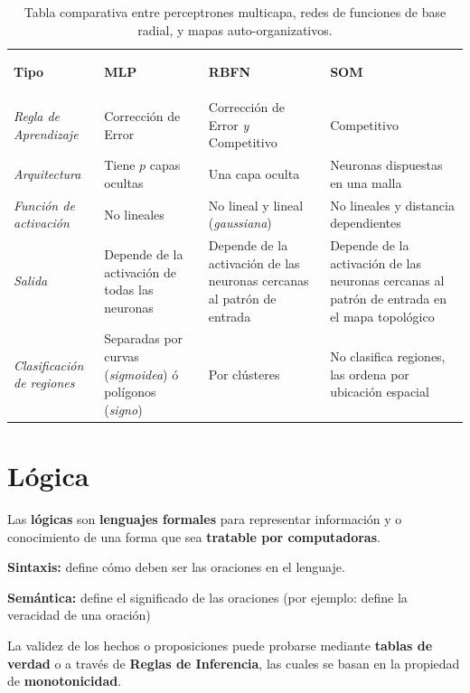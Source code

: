 \documentclass[10pt,a4paper]{article}
\begin{document}
\begin{table}[h]
\centering
\begin{tabular}{  p{2cm} | p{4cm} | p{4cm} | p{4cm}  }
\hline 
\begin{center} \textbf{Tipo} \end{center} & 
\begin{center} \textbf{MLP} \end{center} & 
\begin{center} \textbf{RBFN} \end{center}& 
\begin{center} \textbf{SOM} \end{center} \\
\rowcolor[gray]{.95} 
\textit{Regla de Aprendizaje}&
Corrección de Error &
Corrección de Error \textit{y} Competitivo &
Competitivo \\ 
\textit{Arquitectura}&
Tiene $p$ capas ocultas &
Una capa oculta &
Neuronas dispuestas en una malla \\ \rowcolor[gray]{.95} 
\textit{Función de activación} &
No lineales &
No lineal y lineal (\textit{gaussiana}) &
No lineales y distancia dependientes \\ 
\textit{Salida} &
Depende de la activación de todas las neuronas &
Depende de la activación de las neuronas cercanas al patrón de entrada &
Depende de la activación de las neuronas cercanas al patrón de entrada en el mapa topológico \\ \rowcolor[gray]{.95} 
\textit{Clasificación de regiones} &
Separadas por curvas (\textit{sigmoidea}) ó polígonos (\textit{signo}) &
Por clústeres &
No clasifica regiones, las ordena por ubicación espacial 
\\ \hline
\end{tabular}
\caption{Tabla comparativa entre perceptrones multicapa, redes de funciones de base radial, y mapas auto-organizativos.}
\label{tab:comparativo}
\end{table}

\section{Lógica}
Las \textbf{lógicas} son \textbf{lenguajes formales} para representar información y o conocimiento de una forma que sea \textbf{tratable por computadoras}.
\begin{description}
\item \textbf{Sintaxis:} define cómo deben ser las oraciones en el lenguaje.
\item \textbf{Semántica:} define el significado de las oraciones (por ejemplo: define la veracidad de una oración)
\end{description}
La validez de los hechos o proposiciones puede probarse mediante \textbf{tablas de verdad} o a través de \textbf{Reglas de Inferencia}, las cuales se basan en la propiedad de \textbf{monotonicidad}.
\end{document}

